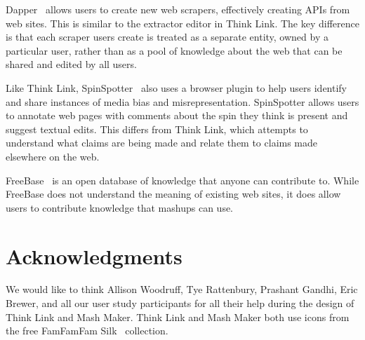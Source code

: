 \documentclass{chi2009}
\begin{document}
Dapper~\cite{dapper} allows users to create new web scrapers, effectively creating APIs from web sites. This is similar to the extractor editor in Think Link. The key difference is that each scraper users create is treated as a separate entity, owned by a particular user, rather than as a pool of knowledge about the web that can be shared and edited by all users.

Like Think Link, SpinSpotter~\cite{spinspotter} also uses a browser plugin to help users identify and share instances of media bias and misrepresentation. SpinSpotter allows users to annotate web pages with comments about the spin they think is present and suggest textual edits. This differs from Think Link, which attempts to understand what claims are being made and relate them to claims made elsewhere on the web.

FreeBase~\cite{freebase} is an open database of knowledge that anyone can contribute to. While FreeBase does not understand the meaning of existing web sites, it does allow users to contribute knowledge that mashups can use.


\section{Acknowledgments}

We would like to think Allison Woodruff, Tye Rattenbury, Prashant Gandhi, Eric Brewer, and all our user study participants for all their help during the design of Think Link and Mash Maker. Think Link and Mash Maker both use icons from the free FamFamFam Silk~\cite{silkicons} collection.



\end{document}
